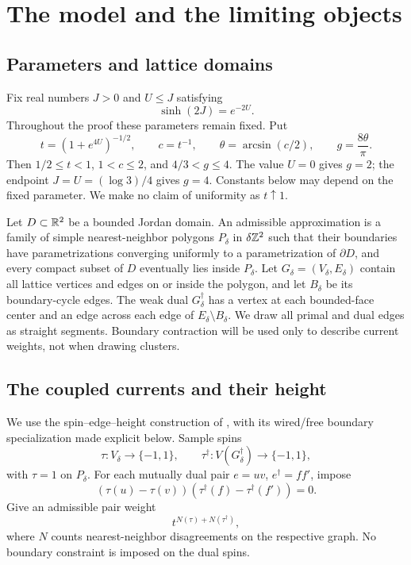 \section{The model and the limiting objects}\label{sec:model}

\subsection{Parameters and lattice domains}\label{sec:lattice-domains}
Fix real numbers \(J>0\) and \(U\leq J\) satisfying
\[
 \sinh(2J)=e^{-2U}.
\]
Throughout the proof these parameters remain fixed. Put
\begin{equation}\label{eq:parameters}
 t=(1+e^{4U})^{-1/2},\qquad c=t^{-1},\qquad
 \theta=\arcsin(c/2),\qquad g=\frac{8\theta}{\pi}.
\end{equation}
Then \(1/2\leq t<1\), \(1<c\leq2\), and \(4/3<g\leq4\).
The value \(U=0\) gives \(g=2\); the endpoint
\(J=U=(\log3)/4\) gives \(g=4\). Constants below may depend on the
fixed parameter. We make no claim of uniformity as \(t\uparrow1\).

Let \(D\subset\mathbb R^2\) be a bounded Jordan domain. An admissible approximation
is a family of simple nearest-neighbor polygons \(P_\delta\) in
\(\delta\mathbb Z^2\) such that their boundaries have parametrizations converging
uniformly to a parametrization of \(\partial D\), and every compact subset
of \(D\) eventually lies inside \(P_\delta\).
Let \(G_\delta=(V_\delta,E_\delta)\) contain all lattice vertices and edges
on or inside the polygon, and let \(B_\delta\) be its boundary-cycle edges.
The weak dual \(G_\delta^\dagger\) has a vertex at each bounded-face center
and an edge across each edge of \(E_\delta\setminus B_\delta\).
We draw all primal and dual edges as straight segments. Boundary
contraction will be used only to describe current weights, not when
drawing clusters.

\subsection{The coupled currents and their height}
We use the spin--edge--height construction of
\cite[Sections~1.1--1.3]{Lis2022Spins}, with its wired/free boundary
specialization made explicit below. Sample spins
\[
 \tau:V_\delta\longrightarrow\{-1,1\},\qquad
 \tau^\dagger:V(G_\delta^\dagger)\longrightarrow\{-1,1\},
\]
with \(\tau=1\) on \(P_\delta\). For each mutually dual pair
\(e=uv\), \(e^\dagger=ff'\), impose
\begin{equation}\label{eq:spin-constraint}
 (\tau(u)-\tau(v))(\tau^\dagger(f)-\tau^\dagger(f'))=0.
\end{equation}
Give an admissible pair weight
\begin{equation}\label{eq:spin-weight}
 t^{N(\tau)+N(\tau^\dagger)},
\end{equation}
where \(N\) counts nearest-neighbor disagreements on the respective
graph. No boundary constraint is imposed on the dual spins.

